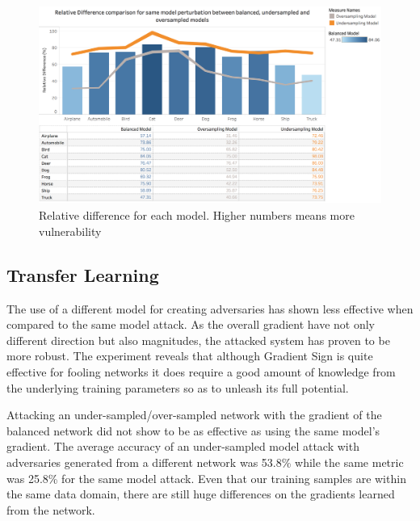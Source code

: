 \documentclass[runningheads,a4paper]{llncs}
\begin{document}
\begin{figure}
	\centering
	\includegraphics[height=6.5cm]{rel_diff_graph.png}
	\caption{Relative difference for each model. Higher numbers means more vulnerability}
	\label{fig:relative_difference}
\end{figure}

\subsection{Transfer Learning}

The use of a different model for creating adversaries has shown less effective when compared to the same model attack. As the overall gradient have not only different direction but also magnitudes, the attacked system has proven to be more robust. The experiment reveals that although Gradient Sign is quite effective for fooling networks it does require a good amount of knowledge from the underlying training parameters so as to unleash its full potential.

Attacking an under-sampled/over-sampled network with the gradient of the balanced network did not show to be as effective as using the same model's gradient. The average accuracy of an under-sampled model attack with adversaries generated from a different network was 53.8\% while the same metric was 25.8\% for the same model attack. Even that our training samples are within the same data domain, there are still huge differences on the gradients learned from the network. 
\end{document}
